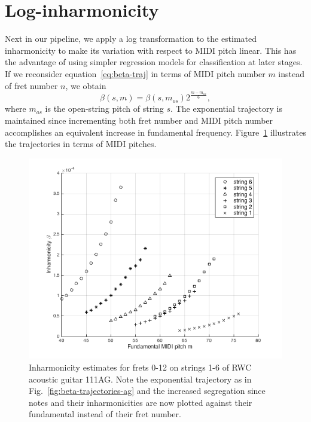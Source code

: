 \documentclass[12pt]{cmuthesis}
\begin{document}
\section{Log-inharmonicity}
Next in our pipeline, we apply a log transformation to the estimated inharmonicity to make its variation with respect to MIDI pitch linear. This has the advantage of using simpler regression models for classification at later stages. If we reconsider equation~\eqref{eq:beta-traj} in terms of MIDI pitch number $m$ instead of fret number $n$, we obtain
\begin{equation}
\beta(s,m) = \beta(s,m_{os})2^{\frac{m-m_{os}}{6}},
\end{equation}
where $m_{os}$ is the open-string pitch of string $s$. The exponential trajectory is maintained since incrementing both fret number and MIDI pitch number accomplishes an equivalent increase in fundamental frequency. Figure~\ref{fig:beta-v-midi} illustrates the trajectories in terms of MIDI pitches.

\begin{figure}[h] 
\centering
\includegraphics[scale=0.7]{beta-v-midi}
\caption{Inharmonicity estimates for frets 0-12 on strings 1-6 of RWC acoustic guitar 111AG. Note the exponential trajectory as in Fig.~\ref{fig:beta-trajectories-ag} and the increased segregation since notes and their inharmonicities are now plotted against their fundamental instead of their fret number.}
\label{fig:beta-v-midi}
\end{figure}
\end{document}
